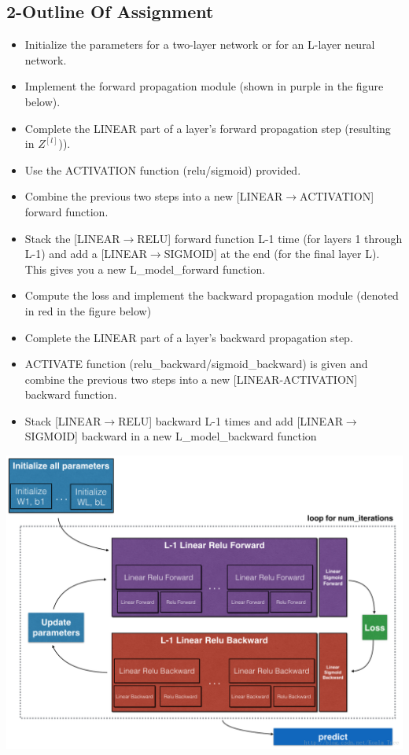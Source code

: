 \documentclass[12pt,a4paper]{article}
\begin{document}
	\subsection{2-Outline Of Assignment}
		\begin{itemize}
			\item Initialize the parameters for a two-layer network or for an L-layer neural network.
			\item Implement the forward propagation module (shown in purple in the figure below). 
			\item Complete the LINEAR part of a layer’s forward propagation step (resulting in $Z^{[l]}$)).
			\item Use the ACTIVATION function (relu/sigmoid) provided.
			\item Combine the previous two steps into a new [LINEAR$\rightarrow$ACTIVATION] forward function.
			\item Stack the [LINEAR$\rightarrow$RELU] forward function L-1 time (for layers 1 through L-1) and add a [LINEAR$\rightarrow$SIGMOID] at the end (for the final layer L). This gives you a new L\_model\_forward function.
			\item Compute the loss and implement the backward propagation module (denoted in red in the figure below)
			\item Complete the LINEAR part of a layer’s backward propagation step.
			\item ACTIVATE function (relu\_backward/sigmoid\_backward) is given and combine the previous two steps into a new [LINEAR-ACTIVATION] backward function.
			\item Stack [LINEAR$\rightarrow$RELU] backward L-1 times and add [LINEAR$\rightarrow$SIGMOID] backward in a new L\_model\_backward function
		\end{itemize}
		\includegraphics[scale=0.7]{image_1.png}
		\newpage
\end{document}
